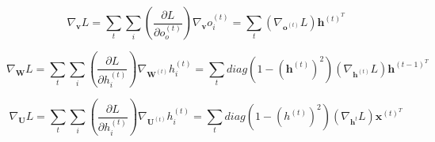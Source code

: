 	\begin{equation}
	\nabla_{\textbf{v}}L = \sum_{t} \sum_{i} \left( \frac{\partial L}{\partial o_o^{(t)}}\right) \nabla_{\textbf{v}}{o_i^{(t)}} = \sum_{t} (\nabla_{\textbf{o}^{(t)}}L) \textbf{h}^{(t)^T}
	\end{equation}
	
	\begin{equation}
		\nabla_{\textbf{W}}L = \sum_{t} \sum_{i} \left(\frac{\partial L}{ \partial h_i^{(t)}}\right) \nabla_{\textbf{W}^{(t)}} h_i^{(t)} = \sum_{t}diag\left( 1 - \left(\textbf{h}^{(t)}\right)^2\right) (\nabla_{\textbf{h}^{(t)}}L)\textbf{h}^{(t-1)^T}
	\end{equation}
	
	\begin{equation}
		\nabla_{\textbf{U}}L = \sum_{t} \sum_{i} \left(\frac{\partial L}{\partial h_i^{(t)}} \right) \nabla_{\textbf{U}^{(t)}}h_i^{(t)} = \sum_t diag \left(1 - \left(h^(t)\right)^2\right) (\nabla_{\textbf{h}^{t}}L)\textbf{x}^{(t)^T}
	\end{equation}
	
%	
%	
%	
%	
%	

	
